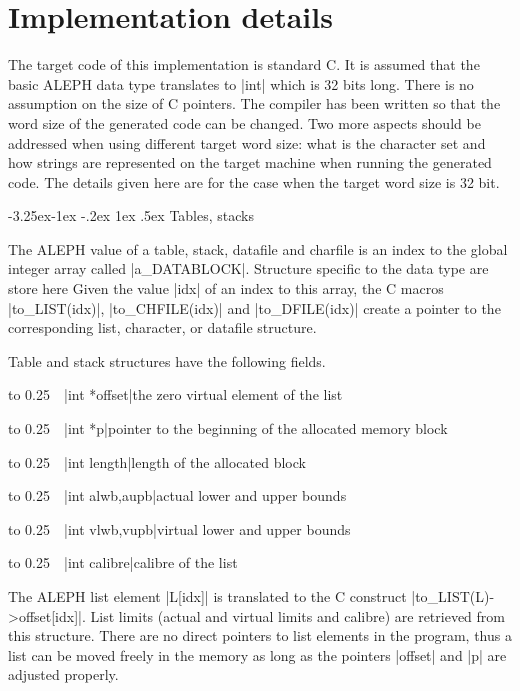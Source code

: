\documentclass{article}
\makeatletter
\newcommand\A{\textsf{ALEPH}}
\newcommand\g[1]{\textsf{#1}}
\renewcommand\subsection{%
\@startsection{subsection}{2}{\z@}%
   {-3.25ex\@plus -1ex \@minus -.2ex}%
   {1ex \@plus .5ex}%
   {\normalfont\normalsize\bfseries}}
\makeatother
\begin{document}

\section{Implementation details}

The target code of this implementation is standard {\sf C}. It is assumed
that the basic \A{} data type translates to \pp|int| which is 32 bits long.
There is no assumption on the size of {\sf C} pointers. The compiler has
been written so that the word size of the generated code can be changed. Two
more aspects should be addressed when using different target word size: what
is the character set and how strings are represented on the target machine
when running the generated code. The details given here are for the case
when the target word size is 32 bit.

\subsection{Tables, stacks}\label{subsec:tables-stacks}

The \A{} value of a \g{table}, \g{stack}, \g{datafile} and \g{charfile} is
an index to the global integer array called \pp|a\_DATABLOCK|. Structure 
specific to the data type are store here Given the value \pp|idx| of an
index to this array, the {\sf C} macros
\pp|to\_LIST(idx)|, \pp|to\_CHFILE(idx)| and \pp|to\_DFILE(idx)| create a
pointer to the corresponding list, character, or datafile structure.

Table and stack structures have the following fields.
\def\HH{\noindent\hbox to 0.25\linewidth\bgroup~~}

\medskip

\HH\pp|int *offset|\HE the zero virtual element of the list

\HH\pp|int *p|\HE  pointer to the beginning of the allocated memory block

\HH\pp|int length|\HE length of the allocated block

\HH\pp|int alwb,aupb|\HE actual lower and upper bounds

\HH\pp|int vlwb,vupb|\HE virtual lower and upper bounds

\HH\pp|int calibre|\HE  calibre of the list

\smallskip
\noindent
The \A{} list element \pp|L[idx]| is translated to the {\sf C} construct
\pp|to\_LIST(L)->\allowbreak offset[idx]|.
List limits (actual and virtual limits and calibre) are
retrieved from this structure. There are no direct pointers to list elements
in the program, thus a list can be moved freely in the memory as long
as the pointers \pp|offset| and \pp|p| are adjusted properly.
\end{document}
